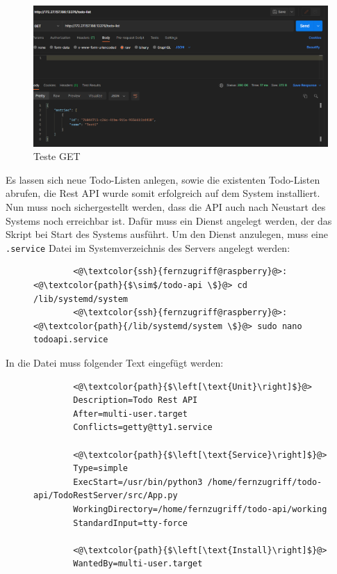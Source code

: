 \documentclass[a4paper, 11pt]{scrartcl}
\begin{document}
\begin{figure}[H]
    \begin{center}
        \includegraphics[scale=0.4]{Bilder/api_postman_test_get.png}
        \caption{Teste GET}\label{pic:api_postman_test_get}
    \end{center}
\end{figure}
Es lassen sich neue Todo-Listen anlegen, sowie die existenten Todo-Listen abrufen, die Rest API wurde somit erfolgreich auf dem System installiert.
\\
Nun muss noch sichergestellt werden, dass die API auch nach Neustart des Systems noch erreichbar ist. Dafür muss ein Dienst angelegt werden, der das Skript bei Start
des Systems ausführt. Um den Dienst anzulegen, muss eine \lstinline[basicstyle={\small\ttfamily\color{black}}]|.service| Datei im Systemverzeichnis des Servers angelegt
werden:
\begin{figure}[H]
    \begin{mdframed}[backgroundcolor=bbg]
        \begin{lstlisting}
        <@\textcolor{ssh}{fernzugriff@raspberry}@>:<@\textcolor{path}{$\sim$/todo-api \$}@> cd /lib/systemd/system
        <@\textcolor{ssh}{fernzugriff@raspberry}@>:<@\textcolor{path}{/lib/systemd/system \$}@> sudo nano todoapi.service
        \end{lstlisting}
    \end{mdframed}
    \label{lst:create_service_file}
\end{figure}
In die Datei muss folgender Text eingefügt werden:
\begin{figure}[H]
    \begin{mdframed}[backgroundcolor=bbg]
        \begin{lstlisting}
        <@\textcolor{path}{$\left[\text{Unit}\right]$}@>
        Description=Todo Rest API
        After=multi-user.target
        Conflicts=getty@tty1.service

        <@\textcolor{path}{$\left[\text{Service}\right]$}@>
        Type=simple
        ExecStart=/usr/bin/python3 /home/fernzugriff/todo-api/TodoRestServer/src/App.py
        WorkingDirectory=/home/fernzugriff/todo-api/working
        StandardInput=tty-force

        <@\textcolor{path}{$\left[\text{Install}\right]$}@>
        WantedBy=multi-user.target
        \end{lstlisting}
    \end{mdframed}
    \label{lst:service_file}
\end{figure}
\end{document}
